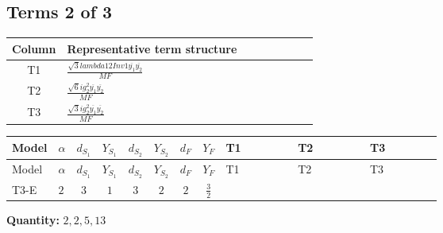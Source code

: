 \documentclass[8pt]{article}
\begin{document}
\begin{landscape}
\subsection*{Terms 2 of 3}
\begin{center}
\begin{tabular}{@{}c >{\raggedright\arraybackslash}p{0.82\linewidth}@{}}
\toprule
Column & Representative term structure \\
\midrule
T1 & \(\displaystyle \frac{\sqrt{3} lambda12Inv1 \overline{y_{1}} \overline{y_{2}}}{MF}\) \\
\midrule
T2 & \(\displaystyle \frac{\sqrt{6} i g_{2}^{2} \overline{y_{1}} \overline{y_{2}}}{MF}\) \\
\midrule
T3 & \(\displaystyle \frac{\sqrt{3} i g_{2}^{2} \overline{y_{1}} \overline{y_{2}}}{MF}\) \\
\midrule
\bottomrule
\end{tabular}
\end{center}
\smallskip
\tiny
\begin{longtable}{@{}llcccccc >{\raggedright\arraybackslash}p{0.21\linewidth} >{\raggedright\arraybackslash}p{0.21\linewidth} >{\raggedright\arraybackslash}p{0.21\linewidth}@{}}
\toprule
Model & $\alpha$ & $d_{S_1}$ & $Y_{S_1}$ & $d_{S_2}$ & $Y_{S_2}$ & $d_F$ & $Y_F$ & T1 & T2 & T3 \\
\midrule
\endfirsthead
\toprule
Model & $\alpha$ & $d_{S_1}$ & $Y_{S_1}$ & $d_{S_2}$ & $Y_{S_2}$ & $d_F$ & $Y_F$ & T1 & T2 & T3 \\
\midrule
\endhead
T3-E & $2$ & $3$ & $1$ & $3$ & $2$ & $2$ & $\frac{3}{2}$ & \scriptsize\adjustbox{max width=\linewidth}{$\begin{gathered} \frac{\sqrt{3} lambda12Inv1 \overline{y_{1}} \overline{y_{2}}}{6 MF}\end{gathered}$} & \scriptsize\adjustbox{max width=\linewidth}{$\begin{gathered} \frac{\sqrt{6} i g_{2}^{2} \overline{y_{1}} \overline{y_{2}}}{3 MF}\end{gathered}$} & \scriptsize\adjustbox{max width=\linewidth}{$\begin{gathered} \frac{\sqrt{3} i g_{2}^{2} \overline{y_{1}} \overline{y_{2}}}{6 MF}\end{gathered}$} \\
\midrule
\bottomrule
\end{longtable}
\clearpage
\noindent\textbf{Quantity: }$\mathrm{2,2,5,13}$\par\smallskip

\end{landscape}
\end{document}
